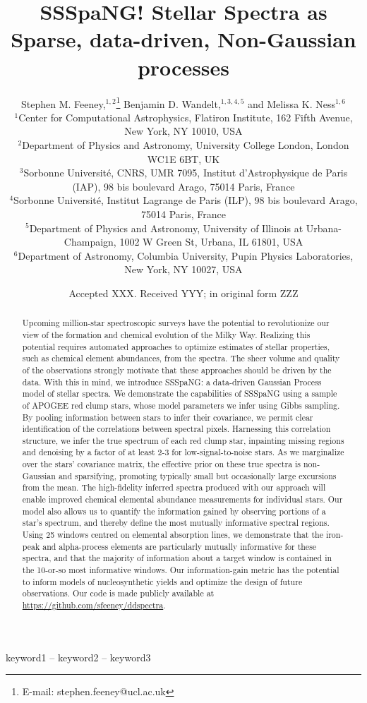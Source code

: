 \documentclass[a4paper,fleqn,usenatbib]{mnras}
\title[Stellar Spectra as Sparse Non-Gaussian Processes]{SSSpaNG! Stellar Spectra as Sparse, data-driven, Non-Gaussian processes}
\author[S. M. Feeney et al.]{
Stephen M. Feeney,$^{1,2}$\thanks{E-mail: stephen.feeney@ucl.ac.uk}
Benjamin D. Wandelt,$^{1,3,4,5}$
and Melissa K. Ness$^{1,6}$ 
\\
$^{1}$Center for Computational Astrophysics, Flatiron Institute, 162 Fifth Avenue, New York, NY 10010, USA\\
$^{2}$Department of Physics and Astronomy, University College London, London WC1E 6BT, UK\\
$^{3}$Sorbonne Universit\'e, CNRS, UMR 7095,  Institut d'Astrophysique de Paris (IAP), 98 bis boulevard Arago, 75014 Paris, France\\
$^{4}$Sorbonne Universit\'e, Institut Lagrange de Paris (ILP), 98 bis boulevard Arago, 75014 Paris, France\\
$^{5}$Department of Physics and Astronomy, University of Illinois at Urbana-Champaign, 1002 W Green St, Urbana, IL 61801, USA\\
$^{6}$Department of Astronomy, Columbia University, Pupin Physics Laboratories, New York, NY 10027, USA
}
\date{Accepted XXX. Received YYY; in original form ZZZ}
\begin{document}
\label{firstpage}
\pagerange{\pageref{firstpage}--\pageref{lastpage}}
\maketitle

\begin{abstract}
Upcoming million-star spectroscopic surveys have the potential to revolutionize our view of the formation and chemical evolution of the Milky Way. Realizing this potential requires automated approaches to optimize estimates of stellar properties, such as chemical element abundances, from the spectra. The sheer volume and quality of the observations strongly motivate that these approaches should be driven by the data. With this in mind, we introduce SSSpaNG: a data-driven Gaussian Process model of stellar spectra. We demonstrate the capabilities of SSSpaNG using a sample of APOGEE red clump stars, whose model parameters we infer using Gibbs sampling. By pooling information between stars to infer their covariance, we permit clear identification of the correlations between spectral pixels. Harnessing this correlation structure, we infer the true spectrum of each red clump star, inpainting missing regions and denoising by a factor of at least 2-3 for low-signal-to-noise stars. As we marginalize over the stars' covariance matrix, the effective prior on these true spectra is non-Gaussian and sparsifying, promoting typically small but occasionally large excursions from the mean. The high-fidelity inferred spectra produced with our approach will enable improved chemical elemental abundance measurements for individual stars. Our model also allows us to quantify the information gained by observing portions of a star's spectrum, and thereby define the most mutually informative spectral regions. Using 25 windows centred on elemental absorption lines, we demonstrate that the iron-peak and alpha-process elements are particularly mutually informative for these spectra, and that the majority of information about a target window is contained in the 10-or-so most informative windows. Our information-gain metric has the potential to inform models of nucleosynthetic yields and optimize the design of future observations. Our code is made publicly available at \href{https://github.com/sfeeney/ddspectra}{https://github.com/sfeeney/ddspectra}. 
\end{abstract}

\begin{keywords}
keyword1 -- keyword2 -- keyword3
\end{keywords}
\end{document}
